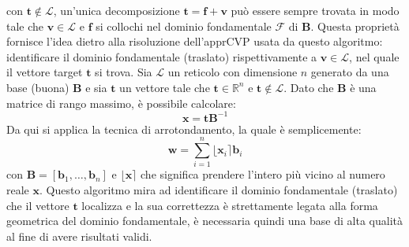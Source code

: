 con $\mathbf{t} \notin \mathcal{L}$, un'unica decomposizione $\mathbf{t} = \mathbf{f} + \mathbf{v}$
può essere sempre trovata in modo tale che $\mathbf{v} \in \mathcal{L}$ e $\mathbf{f}$ si collochi
nel dominio fondamentale $\mathcal{F}$ di $\mathbf{B}$. Questa proprietà fornisce l'idea
dietro alla risoluzione dell'apprCVP usata da questo algoritmo: identificare il dominio fondamentale (traslato) rispettivamente
a $\mathbf{v} \in \mathcal{L}$, nel quale il vettore target $\mathbf{t}$ si trova. 
Sia $\mathcal{L}$ un reticolo con 
dimensione $n$ generato da una base (buona) $\mathbf{B}$ e sia $\mathbf{t}$ un vettore tale che
$\mathbf{t} \in \mathbb{R}^n$ e $\mathbf{t} \notin \mathcal{L}$. Dato che $\mathbf{B}$ è una
matrice di rango massimo, è possibile calcolare:
\[
    \mathbf{x} = \mathbf{t}\mathbf{B}^{-1}
\]
Da qui si applica la tecnica di arrotondamento, la quale è semplicemente:
\[
    \mathbf{w} = \sum_{i=1}^{n} \lfloor \mathbf{x}_i \rceil  \mathbf{b}_i
\]
con $\mathbf{B} = [\mathbf{b}_1,\dots,\mathbf{b}_n]$ e $\lfloor\mathbf{x}\rceil$ che significa
prendere l'intero più vicino al numero reale $\mathbf{x}$. Questo algoritmo mira ad 
identificare il dominio fondamentale (traslato) che il vettore $\mathbf{t}$ localizza e la sua
correttezza è strettamente legata alla forma geometrica del dominio fondamentale, è necessaria
quindi una base di alta qualità al fine di avere risultati validi. 

